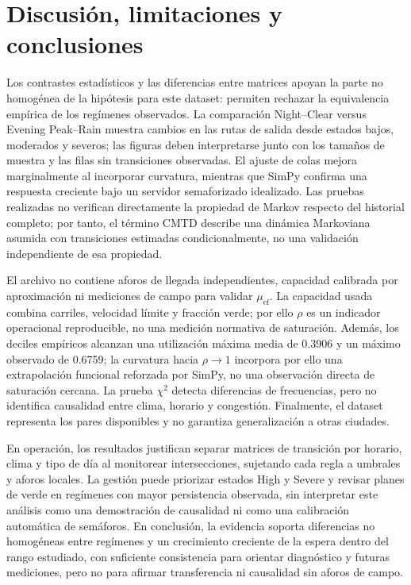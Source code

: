 \documentclass[conference]{IEEEtran}
\begin{document}
\section{Discusión, limitaciones y conclusiones}
Los contrastes estadísticos y las diferencias entre matrices apoyan la parte no homogénea de la hipótesis para este dataset: permiten rechazar la equivalencia empírica de los regímenes observados. La comparación Night--Clear versus Evening Peak--Rain muestra cambios en las rutas de salida desde estados bajos, moderados y severos; las figuras deben interpretarse junto con los tamaños de muestra y las filas sin transiciones observadas. El ajuste de colas mejora marginalmente al incorporar curvatura, mientras que SimPy confirma una respuesta creciente bajo un servidor semaforizado idealizado.
Las pruebas realizadas no verifican directamente la propiedad de Markov respecto del
historial completo; por tanto, el término CMTD describe una dinámica Markoviana asumida
con transiciones estimadas condicionalmente, no una validación independiente de esa propiedad.

El archivo no contiene aforos de llegada independientes, capacidad calibrada por aproximación ni mediciones de campo para validar $\mu_{\mathrm{ef}}$. La capacidad usada combina carriles, velocidad límite y fracción verde; por ello $\rho$ es un indicador operacional reproducible, no una medición normativa de saturación. Además, los deciles empíricos alcanzan una utilización máxima media de 0.3906 y un máximo observado de 0.6759; la curvatura hacia $\rho\to1$ incorpora por ello una extrapolación funcional reforzada por SimPy, no una observación directa de saturación cercana. La prueba $\chi^2$ detecta diferencias de frecuencias, pero no identifica causalidad entre clima, horario y congestión. Finalmente, el dataset representa los pares disponibles y no garantiza generalización a otras ciudades.

En operación, los resultados justifican separar matrices de transición por horario, clima y tipo de día al monitorear intersecciones, sujetando cada regla a umbrales y aforos locales. La gestión puede priorizar estados High y Severe y revisar planes de verde en regímenes con mayor persistencia observada, sin interpretar este análisis como una demostración de causalidad ni como una calibración automática de semáforos. En conclusión, la evidencia soporta diferencias no homogéneas entre regímenes y un crecimiento creciente de la espera dentro del rango estudiado, con suficiente consistencia para orientar diagnóstico y futuras mediciones, pero no para afirmar transferencia ni causalidad sin aforos de campo.
\end{document}
